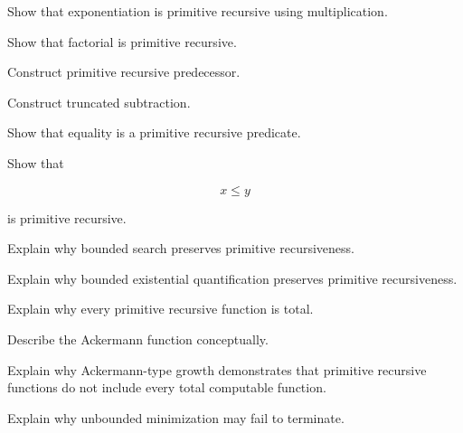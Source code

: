 \begin{exercise}[2]
Show that exponentiation is primitive recursive using multiplication.
\end{exercise}

\begin{exercise}[2]
Show that factorial is primitive recursive.
\end{exercise}

\begin{exercise}[3]
Construct primitive recursive predecessor.
\end{exercise}

\begin{exercise}[3]
Construct truncated subtraction.
\end{exercise}

\begin{exercise}[3]
Show that equality is a primitive recursive predicate.
\end{exercise}

\begin{exercise}[3]
Show that

\[
x\leq y
\]

is primitive recursive.
\end{exercise}

\begin{exercise}[3]
Explain why bounded search preserves primitive recursiveness.
\end{exercise}

\begin{exercise}[3]
Explain why bounded existential quantification preserves primitive
recursiveness.
\end{exercise}

\begin{exercise}[3]
Explain why every primitive recursive function is total.
\end{exercise}

\begin{exercise}[2]
Describe the Ackermann function conceptually.
\end{exercise}

\begin{exercise}[3]
Explain why Ackermann-type growth demonstrates that primitive recursive
functions do not include every total computable function.
\end{exercise}

\begin{exercise}[2]
Explain why unbounded minimization may fail to terminate.
\end{exercise}

